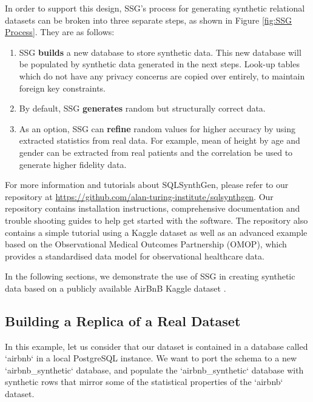 \documentclass[11pt]{article}
\begin{document}
In order to support this design, SSG's process for generating synthetic relational datasets can be broken into three separate steps, as shown in Figure \ref{fig:SSG Process}. They are as follows:

\begin{enumerate}
    \item SSG \textbf{builds} a new database to store synthetic data. This new database will be populated by synthetic data generated in the next steps. Look-up tables which do not have any privacy concerns are copied over entirely, to maintain foreign key constraints.
    \item By default, SSG \textbf{generates} random but structurally correct data. 
    \item As an option, SSG can \textbf{refine} random values for higher accuracy by using extracted statistics from real data. For example, mean of height by age and gender can be extracted from real patients and the correlation be used to generate higher fidelity data.
\end{enumerate}

For more information and tutorials about SQLSynthGen, please refer to our repository at \url{https://github.com/alan-turing-institute/sqlsynthgen}. Our repository \cite{repository} contains installation instructions, comprehensive documentation and trouble shooting guides to help get started with the software. The repository also contains a simple tutorial using a Kaggle dataset \cite{airbnb} as well as an advanced example based on the Observational Medical Outcomes Partnership (OMOP)\cite{omop}, which provides a standardised data model for observational healthcare data. 

In the following sections, we demonstrate the use of SSG in creating synthetic data based on a publicly available AirBnB Kaggle dataset \cite{airbnb}.

\subsection{Building a Replica of a Real Dataset}

In this example, let us consider that our dataset is contained in a database called `airbnb` in a local PostgreSQL instance. We want to port the schema to a new `airbnb\_synthetic` database, and populate the `airbnb\_synthetic` database with synthetic rows that mirror some of the statistical properties of the `airbnb` dataset.

\end{document}
